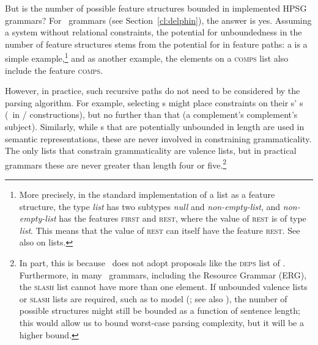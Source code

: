 \documentclass[output=paper,biblatex,babelshorthands,newtxmath,draftmode,colorlinks,citecolor=brown]{langscibook}
\begin{document}
\largerpage
But is the number of possible feature structures bounded
in implemented HPSG grammars?
For \delphin\ grammars (see Section~\ref{cl:delphin}),
the answer is yes.
Assuming a system without relational constraints,
the potential for unboundedness in the number of feature structures
stems from the potential for  in feature paths:
a  is a simple example,\footnote{%
	More precisely, in the standard implementation of a list as a feature structure,
	the type \textit{list} has two subtypes \textit{null} and \textit{non-empty-list}, and
	\textit{non-empty-list} has the features \textsc{first}
	and \textsc{rest}, where the value of \textsc{rest} is of type \textit{list}.
	This means that the value of \textsc{rest} can itself have the feature \textsc{rest}.
	See also \crossrefchapterw[\page \pageref{page-list-encoding}]{formal-background} on lists.
}
and as another example, the elements on a \textsc{comps} list
also include the feature \textsc{comps}.

However, in practice, such recursive paths do not need to be considered by the parsing algorithm.
For example, selecting s might place constraints on their s' s
(\eg\ in / constructions),
but no further than that (\eg a complement's complement's subject).
Similarly, while s that are potentially unbounded in length are used in semantic representations,
these are never involved in constraining grammaticality.
The only lists that constrain grammaticality are valence lists,
but in practical grammars these are never greater than length four or five.\footnote{%
	In part, this is because \delphin\ does not
	adopt proposals like the \textsc{deps} list of \citet*{BMS2001a}.
	Furthermore, in many \delphin\ grammars, including the  Resource Grammar (ERG),
	the \textsc{slash} list cannot have more than one element.
	If unbounded valence lists or \textsc{slash} lists are required,
	such as to model  (\citealp{Rentier94}; see also ),
	the number of possible structures might still be bounded as a function of sentence length;
	this would allow us to bound worst-case parsing complexity,
	but it will be a higher bound.
}
\end{document}
